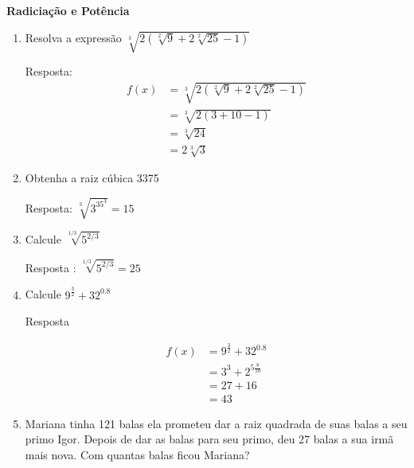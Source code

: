 \documentclass[12pt,onepage,a4paper]{memoir}
\newcommand{\tit}{Radiciação e Potência}
\begin{document}
\thispagestyle{1pagina}
\vspace*{2.5cm} %

\vspace{0.5cm}
\textbf{\textsf{\large \tit}} %



\begin{enumerate} %
\item Resolva a expressão $\sqrt[3]{2\left( \sqrt[2]{9}+2\sqrt[2]{25} - 1
    \right)}$

  Resposta:
  \begin{align*}
    f(x) & = \sqrt[3]{2\left( \sqrt[2]{9}+2\sqrt[2]{25} - 1
           \right)} \\
         & = \sqrt[3]{2\left( 3 + 10 - 1\right)} \\
         & = \sqrt[3]{24} \\
         & = 2\sqrt[3]{3}           
  \end{align*}

\item Obtenha a raiz cúbica 3375

  Resposta:  $\sqrt[3]{3^35^3} = 15$
 
\item Calcule $\sqrt[1/3]{5^{2/3}}$

  Resposta :  $\sqrt[1/3]{5^{2/3}} = 25$

  
\item Calcule $9^{\frac{3}{2}} + 32^{0.8}$

  Resposta

  \begin{align*}
    f(x) & = 9^{\frac{3}{2}} + 32^{0.8} \\
         & = 3^{3}    + 2^{5\frac{8}{10}} \\
         & = 27  +  16 \\
         & = 43           
  \end{align*}
  
  \item Mariana tinha 121 balas ela prometeu dar a raiz quadrada de suas balas a
    seu primo Igor. Depois de dar as balas para seu primo, deu 27 balas a sua
    irmã mais nova. Com quantas balas ficou Mariana?


\end{enumerate}
\end{document}
